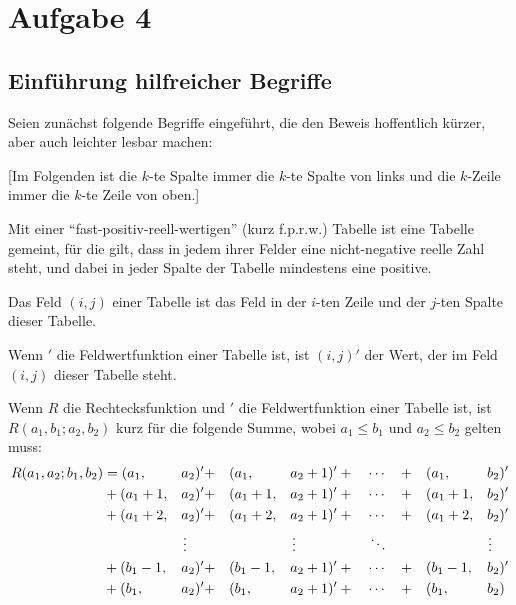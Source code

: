 \section{Aufgabe 4}

\subsection*{Einführung hilfreicher Begriffe}

Seien zunächst folgende Begriffe eingeführt, die den Beweis hoffentlich kürzer, aber auch leichter lesbar machen:

[Im Folgenden ist die $k$-te Spalte immer die $k$-te Spalte von links und die $k$-Zeile immer die $k$-te Zeile von oben.]
\begin{definition}
    Mit einer "`fast-positiv-reell-wertigen"' (kurz f.p.r.w.) Tabelle ist eine Tabelle gemeint, für die gilt, dass 
    in jedem ihrer Felder eine nicht-negative reelle Zahl steht, und dabei in jeder Spalte der Tabelle mindestens 
    eine positive.
\end{definition}
\begin{definition}
    Das Feld $(i, j)$ einer Tabelle ist das Feld in der $i$-ten Zeile und der $j$-ten Spalte dieser Tabelle.
\end{definition}
\begin{definition}
    Wenn $'$ die Feldwertfunktion einer Tabelle ist, ist $(i, j)'$ der Wert, der im Feld $(i, j)$ dieser Tabelle 
    steht.
\end{definition}
\begin{definition}\label{rfunktion}
    Wenn $R$ die Rechtecksfunktion und $'$ die Feldwertfunktion einer Tabelle ist, ist $R(a_1, b_1; a_2, b_2)$ kurz 
    für die folgende Summe, wobei $a_1\leq b_1$ und $a_2\leq b_2$ gelten muss:
    \begin{alignat*}{6}
        R(a_1, a_2; b_1, b_2) &= (a_1, &&a_2)' + &&(a_1, &&a_2+1)' + \quad \cdots \quad + &&(a_1, &&b_2)'\\
        &+(a_1+1, &&a_2)' + &&(a_1+1, &&a_2+1)' +\quad \cdots \quad + &&(a_1+1, &&b_2)'\\
        &+(a_1+2, &&a_2)' + &&(a_1+2, &&a_2+1)' +\quad \cdots \quad + &&(a_1+2, &&b_2)'\\
        & &&\vdotswithin{a} && &&\vdotswithin{a}\quad\quad\quad\quad\quad \ddots && &&\vdotswithin{b} \\
        &+(b_1-1, &&a_2)' + &&(b_1-1, &&a_2+1)' +\quad \cdots \quad + &&(b_1-1, &&b_2)'\\
        &+(b_1, &&a_2)' + &&(b_1, &&a_2+1)' + \quad \cdots \quad + &&(b_1, &&b_2)
    \end{alignat*}    
\end{definition}

